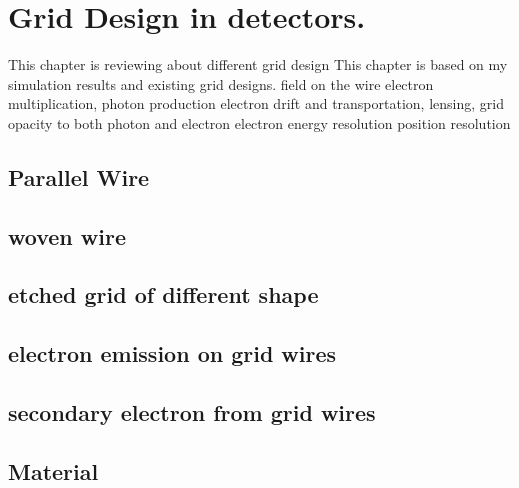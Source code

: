 \label{Chapter2}
\chapter{Grid Design in detectors.}
This chapter is reviewing about different grid design 
This chapter is based on my simulation results and existing grid designs.
field on the wire
electron multiplication, photon production
electron drift and transportation, lensing, grid opacity to both photon and electron
electron 
energy resolution
position resolution
\section{Parallel Wire}
\section{woven wire}
\section{etched grid of different shape}
\section{electron emission on grid wires}
\section{secondary electron from grid wires}
\section{Material}




